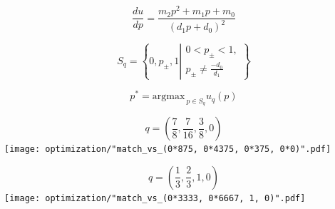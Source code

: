 \documentclass{beamer}
\begin{document}
\begin{frame}
\centering
\large \[ \frac{du}{dp} = \frac{m_2p^2 +m_1p + m_0}{(d_1p + d_0)^2}\]
\begin{figure}[H]
    \begin{subfigure}[t]{0.30\textwidth}
            
        \end{subfigure}
        \hspace{1cm}
    \begin{subfigure}[t]{0.30\textwidth}\centering
        
    \end{subfigure}
 
    \vspace{1cm}
    \begin{subfigure}[t]{0.30\textwidth}
            
        \end{subfigure}
    \hspace{1cm}
    \begin{subfigure}[t]{0.30\textwidth}\centering
        
    \end{subfigure}
\end{figure}
\end{frame}

\begin{frame}
\centering
\footnotesize
\begin{theorem}\label{theorem:random_optimization}
\[S_q = \left \{0, p_{\pm}, 1 \left | 
\begin{array}{l}
 0 < p_{\pm} < 1, \\
 p_{\pm} \neq \frac{-d_0}{d_1}  
 \end{array} \right. \right \} \]

 \[p^* = \text{argmax}_{\ p \in S_q} u_q(p)\]
\end{theorem}
\end{frame}

\begin{frame}
\centering
   \Large \[ q=\left(\frac{7}{8}, \frac{7}{16}, \frac{3}{8}, 0 \right) \]
      \texttt{[image: optimization/"match\_vs\_(0*875, 0*4375, 0*375, 0*0)".pdf]}
\end{frame}

\begin{frame}
\centering
   \Large \[ q=\left( \frac{1}{3}, \frac{2}{3}, 1, 0 \right) \]
      \texttt{[image: optimization/"match\_vs\_(0*3333, 0*6667, 1, 0)".pdf]}
\end{frame}
\end{document}
